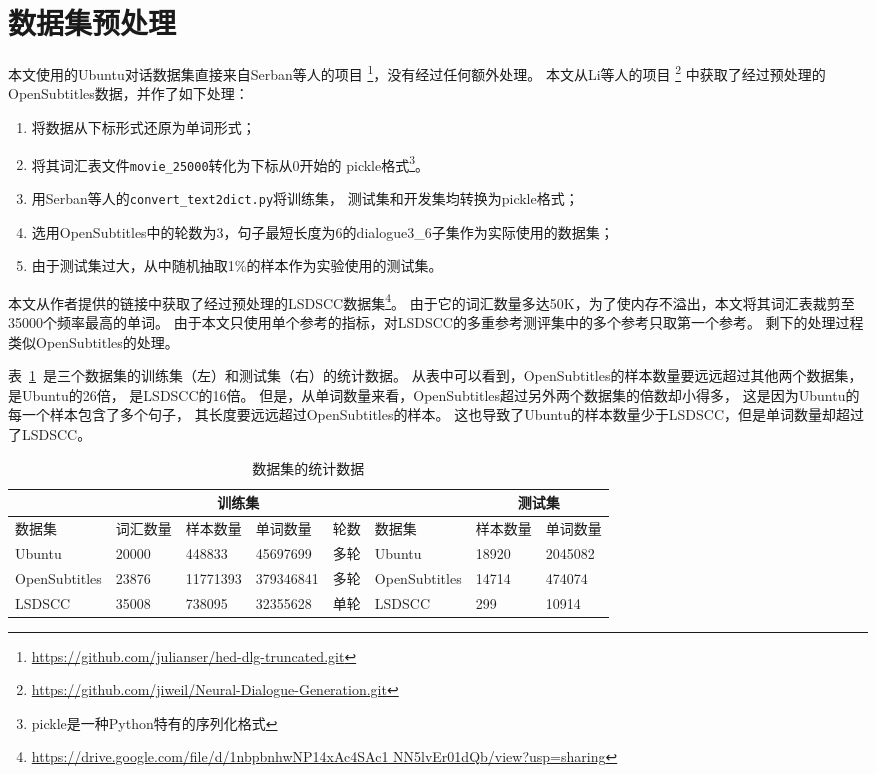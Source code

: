 \section{数据集预处理}
\label{sec:dataset_proprecessing}
本文使用的Ubuntu对话数据集直接来自Serban等人的项目
\footnote{\url{https://github.com/julianser/hed-dlg-truncated.git}}，没有经过任何额外处理。
本文从Li等人的项目
\footnote{\url{https://github.com/jiweil/Neural-Dialogue-Generation.git}}
中获取了经过预处理的OpenSubtitles数据，并作了如下处理：
\begin{enumerate}
    \item 将数据从下标形式还原为单词形式；
    \item 将其词汇表文件\texttt{movie\_25000}转化为下标从0开始的
    pickle格式\footnote{pickle是一种Python特有的序列化格式}。
    \item 用Serban等人的\texttt{convert\_text2dict.py}将训练集，
    测试集和开发集均转换为pickle格式；
    \item 选用OpenSubtitles中的轮数为3，句子最短长度为6的dialogue3\_6子集作为实际使用的数据集；
    \item 由于测试集过大，从中随机抽取1\%的样本作为实验使用的测试集。
\end{enumerate}

本文从作者提供的链接中获取了经过预处理的LSDSCC数据集\footnote{\url{https://drive.google.com/file/d/1nbpbnhwNP14xAc4SAc1 NN5lvEr01dQb/view?usp=sharing}}。
由于它的词汇数量多达50K，为了使内存不溢出，本文将其词汇表裁剪至35000个频率最高的单词。
由于本文只使用单个参考的指标，对LSDSCC的多重参考测评集中的多个参考只取第一个参考。
剩下的处理过程类似OpenSubtitles的处理。

表~\ref{tab:dataset_stats}~是三个数据集的训练集（左）和测试集（右）的统计数据。
从表中可以看到，OpenSubtitles的样本数量要远远超过其他两个数据集，
是Ubuntu的26倍， 是LSDSCC的16倍。
但是，从单词数量来看，OpenSubtitles超过另外两个数据集的倍数却小得多，
这是因为Ubuntu的每一个样本包含了多个句子，
其长度要远远超过OpenSubtitles的样本。
这也导致了Ubuntu的样本数量少于LSDSCC，但是单词数量却超过了LSDSCC。
\begin{table}[H]
    \centering
    \caption{数据集的统计数据}
    \label{tab:dataset_stats}
    \begin{tabular}{*{8}{l}}
        \toprule
        \midrule
        & \multicolumn{4}{c}{训练集} & & \multicolumn{2}{c}{测试集} \\
        \midrule
        数据集 & 词汇数量 & 样本数量 & 单词数量 & 轮数 & 数据集 & 样本数量 & 单词数量 \\
        \midrule
        Ubuntu & 20000 & 448833 & 45697699 & 多轮 & Ubuntu & 18920 & 2045082   \\
        OpenSubtitles & 23876 & 11771393 & 379346841 & 多轮 & OpenSubtitles & 14714 & 474074 \\
        LSDSCC & 35008 & 738095 & 32355628 & 单轮 & LSDSCC & 299 & 10914 \\
        \bottomrule
    \end{tabular}
\end{table}

